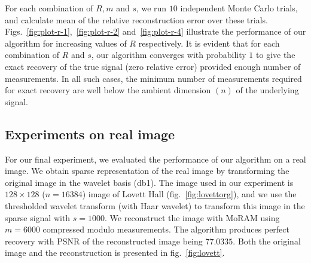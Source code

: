 For each combination of $R, m$ and $s$, we run $10$ independent Monte Carlo trials, and calculate mean of the relative reconstruction error over these trials. Figs.~\ref{fig:plot-r-1},~\ref{fig:plot-r-2} and~\ref{fig:plot-r-4} illustrate the performance of our algorithm for increasing values of $R$ respectively. It is evident that for each combination of $R$ and $s$, our algorithm converges with probability $1$ to give the exact recovery of the true signal (zero relative error) provided enough number of measurements. In all such cases, the minimum number of measurements required for exact recovery are well below the ambient dimension $(n)$ of the underlying signal. 

\subsection{Experiments on real image}
For our final experiment, we evaluated the performance of our algorithm on a real image. We obtain sparse representation of the real image by transforming the original image in the wavelet basis (db1). The image used in our experiment is $128 \times 128$ ($n=16384$) image of Lovett Hall (fig.~\ref{fig:lovettorg}), and  we use the thresholded wavelet transform (with Haar wavelet) to transform this image in the sparse signal with $s = 1000$. We reconstruct the image with MoRAM using $m = 6000$ compressed modulo measurements. The algorithm produces perfect recovery with PSNR of the reconstructed image being $77.0335$. Both the original image and the reconstruction is presented in fig.~\ref{fig:lovett}.
%

